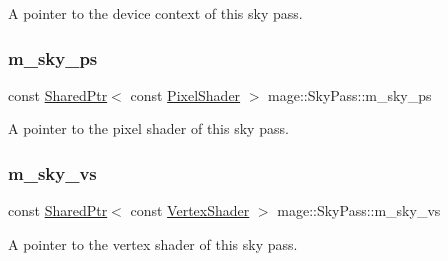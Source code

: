 A pointer to the device context of this sky pass. \hypertarget{classmage_1_1_sky_pass_abe9548ff1e4b3c15ac9004e4ba4ca052}{}\label{classmage_1_1_sky_pass_abe9548ff1e4b3c15ac9004e4ba4ca052} 
\subsubsection{\texorpdfstring{m\+\_\+sky\+\_\+ps}{m\_sky\_ps}}
{\footnotesize\ttfamily const \hyperlink{namespacemage_a1e01ae66713838a7a67d30e44c67703e}{Shared\+Ptr}$<$ const \hyperlink{namespacemage_a27ecaf266420ee7a494d64edc0757129}{Pixel\+Shader} $>$ mage\+::\+Sky\+Pass\+::m\+\_\+sky\+\_\+ps\hspace{0.3cm}{\ttfamily [private]}}

A pointer to the pixel shader of this sky pass. \hypertarget{classmage_1_1_sky_pass_a406ffced453d34b583a7bf975cf7f70f}{}\label{classmage_1_1_sky_pass_a406ffced453d34b583a7bf975cf7f70f} 
\subsubsection{\texorpdfstring{m\+\_\+sky\+\_\+vs}{m\_sky\_vs}}
{\footnotesize\ttfamily const \hyperlink{namespacemage_a1e01ae66713838a7a67d30e44c67703e}{Shared\+Ptr}$<$ const \hyperlink{classmage_1_1_vertex_shader}{Vertex\+Shader} $>$ mage\+::\+Sky\+Pass\+::m\+\_\+sky\+\_\+vs\hspace{0.3cm}{\ttfamily [private]}}

A pointer to the vertex shader of this sky pass. 